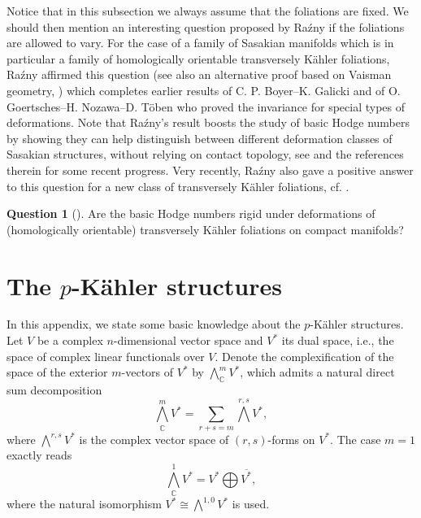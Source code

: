 \documentclass[12pt]{amsart}
\numberwithin{equation}{section}
\theoremstyle{definition}
\newtheorem{question}  [theorem]     {Question}
\theoremstyle{definition}
\theoremstyle{definition}
\renewcommand{\1}{\mathsf{1}}
\renewcommand{\>}{\rightarrow}
\theoremstyle{plain} %
\theoremstyle{plain} %
\theoremstyle{plain} %
\begin{document}
	Notice that  in this subsection we always assume that the foliations are fixed. We should then mention an interesting question proposed by Ra\'zny if the foliations are allowed to vary.  For the case of a  family of Sasakian manifolds which is in particular a family of homologically orientable transversely K\"ahler foliations, Ra\'zny \cite[Theorem 1]{Ra21} affirmed this question (see also an alternative proof based on Vaisman geometry, \cite[Theorem 31.25]{OV22})  which completes earlier results of C. P. Boyer--K. Galicki \cite{BG08} and of O. Goertsches--H. Nozawa--D. T\"oben \cite{GNT16} who proved the invariance for special types of deformations. Note that Ra\'zny's result boosts the study of basic Hodge numbers by showing they can help distinguish between different deformation classes of Sasakian structures, without relying on contact topology, see \cite{KP22} and the references therein for some recent progress. Very recently, Ra\'zny also gave a positive answer to this question for a new class of transversely K\"ahler foliations, cf. \cite{Ra22}.
	
	\begin{question}[{\cite[Question 1.2]{Ra21}}] \label{Razny question}
		Are the basic Hodge numbers rigid under deformations of (homologically orientable)
		transversely K\"ahler foliations on compact manifolds?
	\end{question}
	
	\appendix
	\section{The \texorpdfstring{$p$}{p}-K\"{a}hler structures} \label{p}
	
	In this appendix, we state some basic knowledge about the $p$-K\"{a}hler structures. Let $V$ be a complex $n$-dimensional vector space and  $V^{*}$ its
	dual space, i.e., the space of complex linear functionals
	over $V$. Denote the complexification of the space of the exterior $m$-vectors
	of $V^{*}$ by $\bigwedge^{m}_{\mathbb{C}} V^{*}$, which admits a
	natural direct sum decomposition
	\[ \bigwedge^{m}_{\mathbb{C}} V^{*} = \sum_{r+s=m} \bigwedge^{r,s} V^*, \]
	where $\bigwedge^{r,s} V^*$ is the complex vector space
	of $(r,s)$-forms on $V^*$.
	The case $m=1$ exactly reads \[ \bigwedge^{1}_{\mathbb{C}} V^{*} =
	V^* \bigoplus \overline{V^{*}},\] where the natural isomorphism $V^*
	\cong \bigwedge^{1,0}V^*$ is used. 
    
\end{document}
